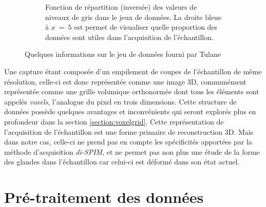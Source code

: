 {{\begin{figure}[H]
\begin{subfigure}{.8\linewidth}
                \caption{Fonction de répartition (inversée) des valeurs de niveaux de gris dans le jeux de données. La droite bleue à $x~=~5$ est permet de visualiser quelle proportion des données sont utiles dans l'acquisition de l'échantillon.}
                \label{img:prostate:stats:repartition}
            \end{subfigure}
            \captionsetup{width=.8\linewidth}
            \caption{Quelques informations sur le jeu de données fourni par Tulane}
            \label{img:prostate:stats}
        \end{figure}
        
        Une capture étant composée d'un empilement de coupes de l'échantillon de même résolution, celle-ci est donc représentée comme une image 3D, communément représentée comme une grille volumique orthonormée dont tous les éléments sont appelés \textit{voxels}, l'analogue du pixel en trois dimensions. Cette structure de données possède quelques avantages et inconvénients qui seront explorés plus en profondeur dans la section \ref{section:voxelgrid}. Cette représentation de l'acquisition de l'échantillon est une forme primaire de reconstruction 3D. Mais dans notre cas, celle-ci ne prend pas en compte les spécificités apportées par la méthode d'acquisition \textit{di-SPIM}, et ne permet pas non plus une étude de la forme des glandes dans l'échantillon car celui-ci est déformé dans son état actuel.
    }
    
	\section{Pré-traitement des données}\label{section:previous_tulane_work}
	{
	    
}}
